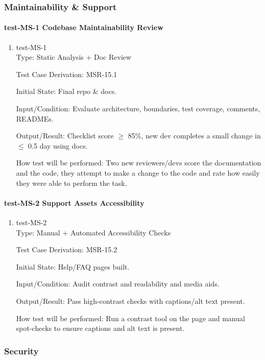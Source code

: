 \documentclass[12pt, titlepage]{article}
\begin{document}
\subsubsection{Maintainability \& Support}

\paragraph{test-MS-1 Codebase Maintainability Review}

\begin{enumerate}
\item{test-MS-1\\}
Type: Static Analysis + Doc Review

Test Case Derivation: MSR-15.1

Initial State: Final repo \& docs.

Input/Condition: Evaluate architecture, boundaries, test coverage, comments, READMEs.

Output/Result: Checklist score $\geq$ 85\%, new dev completes a small change in $\leq$ 0.5 day using docs.

How test will be performed: Two new reviewers/devs score the documentation and the code, they attempt to make a change to the code and rate how easily they were able to perform the task.
\end{enumerate}

\paragraph{test-MS-2 Support Assets Accessibility}

\begin{enumerate}
\item{test-MS-2\\}
Type: Manual + Automated Accessibility Checks

Test Case Derivation: MSR-15.2

Initial State: Help/FAQ pages built.

Input/Condition: Audit contrast and readability and media aids.

Output/Result: Pass high-contrast checks with captions/alt text present.

How test will be performed: Run a contrast tool on the page and manual spot-checks to ensure captions and alt text is present.
\end{enumerate}

\subsubsection{Security}
\end{document}
